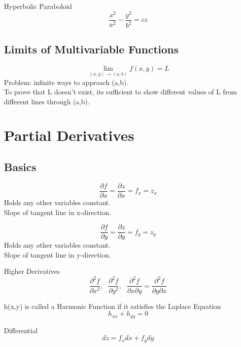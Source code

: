 \documentclass[12pt]{article}
\numberwithin{equation}{subsection}
\newcommand{\parx}[1]{\frac{\partial #1}{\partial x}}
\newcommand{\pary}[1]{\frac{\partial #1}{\partial y}}
\begin{document}
\begin{flushleft}
Hyperbolic Paraboloid 
\begin{equation}
\frac{x^2}{a^2}-\frac{y^2}{b^2}=cz
\end{equation}

\subsection{Limits of Multivariable Functions}
\begin{equation}
\lim_{(x,y)\rightarrow (a,b)}f(x,y)=L
\end{equation}
Problem: infinite ways to approach (a,b). \\
To prove that L doesn't exist, its sufficient to show different values of L from different lines through (a,b).
\newpage

\section{Partial Derivatives}
\subsection{Basics}
\begin{equation}
\parx{f}= \parx{z}=f_{x}=z_{x}
\end{equation}
Holds any other variables constant.\\
Slope of tangent line in x-direction.

\begin{equation}
\pary{f}=\pary{z}=f_{y}=z_{y}
\end{equation}
Holds any other variables constant.\\
Slope of tangent line in y-direction.\\
\bigskip

Higher Derivatives
\begin{equation}
\frac{\partial^2 f}{\partial x^2},\ \ \ \frac{\partial^2 f}{\partial y^2},\ \ \ \frac{\partial^2 f}{\partial x \partial y}=\frac{\partial^2 f}{\partial y \partial x}
\end{equation}

h(x,y) is called a Harmonic Function if it satisfies the Laplace Equation
\begin{equation}
h_{xx}+h_{yy}=0
\end{equation}

Differential
\begin{equation}
dz=f_{x}dx+f_{y}dy
\end{equation}


\end{flushleft}
\end{document}
